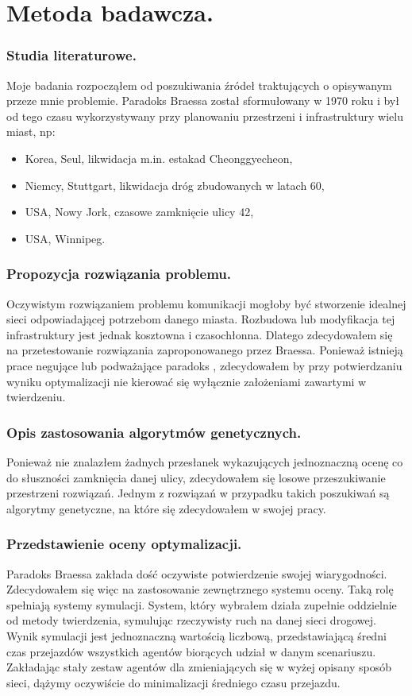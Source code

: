 \documentclass[twoside,12pt]{report}
\begin{document}
\section{Metoda badawcza.}
\subsubsection{Studia literaturowe.}
Moje badania rozpocząłem od poszukiwania źródeł traktujących o opisywanym przeze mnie problemie. Paradoks Braessa został sformułowany w 1970 roku i był od tego czasu wykorzystywany przy planowaniu przestrzeni i infrastruktury wielu miast, np:

\begin{itemize}
\item Korea, Seul, likwidacja m.in. estakad Cheonggyecheon,
\item Niemcy, Stuttgart, likwidacja dróg zbudowanych w latach 60,
\item USA, Nowy Jork, czasowe zamknięcie ulicy 42,
\item USA, Winnipeg.\cite{urban}
\end{itemize}  

\subsubsection{Propozycja rozwiązania problemu.}
Oczywistym rozwiązaniem problemu komunikacji mogłoby być stworzenie idealnej sieci odpowiadającej potrzebom danego miasta. Rozbudowa lub modyfikacja tej infrastruktury jest jednak kosztowna i czasochłonna. Dlatego zdecydowałem się na przetestowanie rozwiązania zaproponowanego przez Braessa. Ponieważ istnieją prace negujące lub podważające paradoks\cite{newinsights} , zdecydowałem by przy potwierdzaniu wyniku optymalizacji nie kierować się wyłącznie założeniami zawartymi w twierdzeniu.

\subsubsection{Opis zastosowania algorytmów genetycznych.}
Ponieważ nie znalazłem żadnych przesłanek wykazujących jednoznaczną ocenę co do słuszności zamknięcia danej ulicy, zdecydowałem się losowe przeszukiwanie przestrzeni rozwiązań. Jednym z rozwiązań w przypadku takich poszukiwań są algorytmy genetyczne, na które się zdecydowałem w swojej pracy.

\subsubsection{Przedstawienie oceny optymalizacji.}
Paradoks Braessa zakłada dość oczywiste potwierdzenie swojej wiarygodności. Zdecydowałem się więc na zastosowanie zewnętrznego systemu oceny. Taką rolę spełniają systemy symulacji. System, który wybrałem działa zupełnie oddzielnie od metody twierdzenia, symulując rzeczywisty ruch na danej sieci drogowej. Wynik symulacji jest jednoznaczną wartością liczbową, przedstawiającą średni czas przejazdów wszystkich agentów biorących udział w danym scenariuszu. Zakładając stały zestaw agentów dla zmieniających się w wyżej opisany sposób sieci, dążymy oczywiście do minimalizacji średniego czasu przejazdu.
\end{document}
